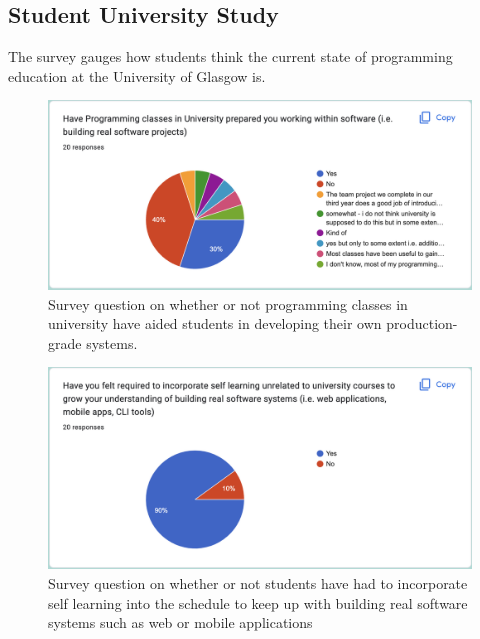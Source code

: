 \documentclass{l4proj}
\begin{document}
\begin{appendices}
\chapter{Student University Study}

\text The survey gauges how students think the current state of programming education at the University of Glasgow is.

\begin{figure}[!ht]
    \centering
    \includegraphics[width=14cm]{dissertation/images/prog-survey-Q1.png}
    \caption{Survey question on whether or not programming classes in university have aided students in developing their own production-grade systems.}
    \label{fig:survey-q1}
\end{figure}

\begin{figure}[!ht]
    \centering
    \includegraphics[width=14cm]{dissertation/images/prog-survey-Q2.png}
    \caption{Survey question on whether or not students have had to incorporate self learning into the schedule to keep up with building real software systems such as web or mobile applications}
    \label{fig:survey-q2}
\end{figure}


\end{appendices}
\end{document}

